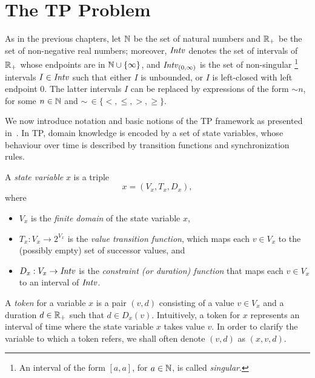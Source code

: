 \section{The TP Problem}\label{sec:preliminTimelines}

As in the previous chapters, let $\mathbb{N}$ be the set of natural numbers and ${\mathbb{R}_+}$ be the set of non-negative real numbers; moreover, ${\mathit{Intv}}$ denotes the set of intervals of ${\mathbb{R}_+}$ whose endpoints are in $\mathbb{N}\cup\{\infty\}$, and ${\mathit{Intv}}_{(0,\infty)}$ is the set of non-singular%
\footnote{An interval of the form $[a,a]$, for $a\in\mathbb{N}$, is called \emph{singular}.} 
intervals $I\in {\mathit{Intv}}$ such that
  either $I$ is unbounded, or $I$
  is left-closed with left endpoint $0$. The latter intervals $I$ can be replaced by expressions of the form $\sim n$, for some $n\in\mathbb{N}$
  and $\sim\,\in\{<,\leq,>,\geq\}$.
%



We now introduce notation and basic notions of
the TP framework as presented in~\cite{MayerOU16,GiganteMCO16}.
%
In TP, domain knowledge is encoded by a set of state variables, whose behaviour over time is described by transition functions and synchronization rules.

\begin{definition}
  \label{def:statevar}
  A \emph{state variable} $x$ is a triple \[x= (V_x,T_x,D_x),\] where 
  \begin{itemize}
      \item $V_x$ is the \emph{finite domain} of the state variable $x$,
      \item $T_x:V_x\to 2^{V_x}$ is the \emph{value transition function}, which maps
        each $v\in V_x$ to the (possibly empty) set of successor values, and
      \item $D_x:V_x\to {\mathit{Intv}}$ is the \emph{constraint (or duration) function} that maps each $v\in V_x$
        to an interval of ${\mathit{Intv}}$.
  \end{itemize}   
\end{definition}

A \emph{token} for a variable $x$ is a pair $(v,d)$ consisting of a value $v\in V_x$ and a duration $d\in {\mathbb{R}_+}$
such that $d\in D_x(v)$. Intuitively, a token for $x$ represents an interval of time where the state variable $x$ takes value $v$.
In order to clarify the variable to which a token refers, we shall often denote $(v,d)$ as $(x,v,d)$.

